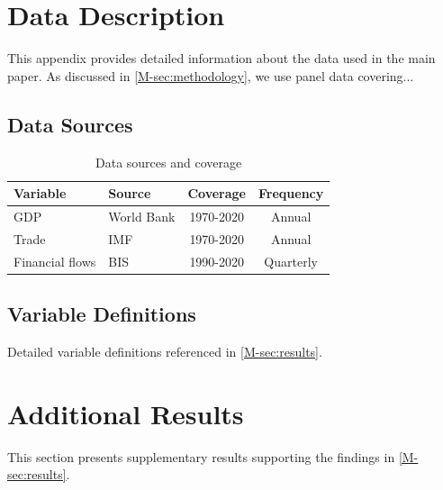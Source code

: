 \documentclass[12pt, draft, colorlinks, doublespace, onlineappendix]{bp-article}
\begin{document}



\section{Data Description} \label{sec:data}

This appendix provides detailed information about the data used in the main paper.
As discussed in \cref{M-sec:methodology}, we use panel data covering...

\subsection{Data Sources} \label{subsec:sources}

\begin{table}[htbp]
    \centering
    \caption{Data sources and coverage}
    \label{tab:datasources}
    \begin{tabular}{llcc}
        \toprule
        Variable & Source & Coverage & Frequency \\
        \midrule
        GDP & World Bank & 1970-2020 & Annual \\
        Trade & IMF & 1970-2020 & Annual \\
        Financial flows & BIS & 1990-2020 & Quarterly \\
        \bottomrule
    \end{tabular}
\end{table}

\subsection{Variable Definitions} \label{subsec:variables}

Detailed variable definitions referenced in \cref{M-sec:results}.


\section{Additional Results} \label{sec:additional}

This section presents supplementary results supporting the findings in \cref{M-sec:results}.
\end{document}
